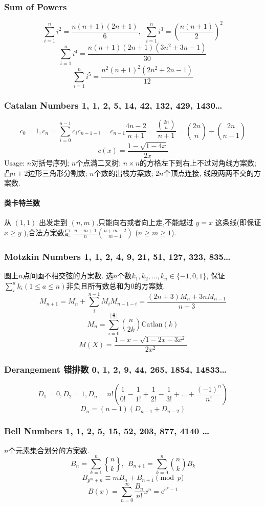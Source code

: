 \begin{footnotesize}
\subsubsection{Sum of Powers}
\[\sum_{i=1}^ni^2=\frac{n(n+1)(2n+1)}{6},\ \ \sum_{i=1}^ni^3=\left(\frac{n(n+1)}{2}\right)^2\]
\[\sum_{i=1}^ni^4=\frac{n(n+1)(2n+1)(3n^2+3n-1)}{30}\]
\[\sum_{i=1}^ni^5=\frac{n^2(n+1)^2(2n^2+2n-1)}{12}\]

\subsubsection{Catalan Numbers 1, 1, 2, 5, 14, 42, 132, 429, 1430\dots}
\[c_{0}=1,c_n=\sum_{i=0}^{n-1}c_ic_{n-1-i}=c_{n-1}\frac{4n-2}{n+1}=\frac{\binom{2n}{n}}{n+1}=\binom{2n}{n}-\binom{2n}{n-1}\]
\[ c(x)=\frac{1-\sqrt{1-4x}}{2x}\]
Usage: $n$对括号序列; $n$个点满二叉树; $n\times n$的方格左下到右上不过对角线方案数; 凸$n+2$边形三角形分割数; $n$个数的出栈方案数; $2n$个顶点连接, 线段两两不交的方案数.
\paragraph*{类卡特兰数}
从 $(1,1)$ 出发走到 $(n,m)$,只能向右或者向上走,不能越过 $y=x$ 这条线(即保证 $x\geq y$ ),合法方案数是 $\frac{n-m+1}{n}\binom{n+m-2}{m-1}$ ($n\ge m\ge 1$).
\subsubsection{Motzkin Numbers 1, 1, 2, 4, 9, 21, 51, 127, 323, 835\dots}
圆上$n$点间画不相交弦的方案数. 选$n$个数$k_1,k_2,...,k_n\in\{-1,0,1\}$, 保证$\sum_i^ak_i(1\leq a\leq n)$非负且所有数总和为$0$的方案数. \[M_{n+1}=M_n+\sum_i^{n-1}M_iM_{n-1-i}=\frac{(2n+3)M_n+3nM_{n-1}}{n+3}\]
\[M_n=\sum_{i=0}^{\lfloor \frac{n}{2}\rfloor}\binom{n}{2k} \mathrm{Catlan}(k)\]
\[M(X)=\frac{1-x-\sqrt{1-2x-3x^2}}{2x^2}\]
\subsubsection{Derangement 错排数 0, 1, 2, 9, 44, 265, 1854, 14833\dots}
\[D_1=0,D_2=1,D_n=n!(\frac{1}{0!}-\frac{1}{1!}+\frac{1}{2!}-\frac{1}{3!}+...+\frac{(-1)^n}{n!})\]
\[D_n=(n-1)(D_{n-1}+D_{n-2})\]
\subsubsection{Bell Numbers 1, 1, 2, 5, 15, 52, 203, 877, 4140 \dots}
$n$个元素集合划分的方案数.
\[ B_n=\sum_{k=1}^{n}{n\brace k},\ \ B_{n+1} = \sum_{k=0}^n{n \choose k}B_k \]
\[ B_{p^m+n} \equiv mB_n+B_{n+1} \pmod{p} \]
\[B(x)=\sum_{n=0}^{\infty}\frac{B_n}{n!}x^n=\mathrm{e}^{\mathrm{e}^x-1}\]

\end{footnotesize}
